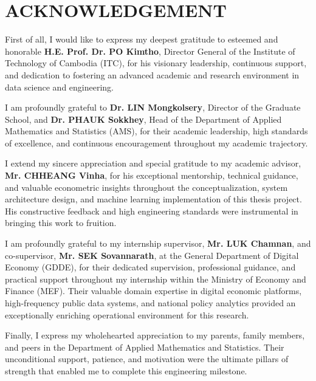 \chapter*{\centering ACKNOWLEDGEMENT}

\hs First of all, I would like to express my deepest gratitude to esteemed and honorable \textbf{H.E. Prof. Dr. PO Kimtho}, Director General of the Institute of Technology of Cambodia (ITC), for his visionary leadership, continuous support, and dedication to fostering an advanced academic and research environment in data science and engineering.

\hs I am profoundly grateful to \textbf{Dr. LIN Mongkolsery}, Director of the Graduate School, and \textbf{Dr. PHAUK Sokkhey}, Head of the Department of Applied Mathematics and Statistics (AMS), for their academic leadership, high standards of excellence, and continuous encouragement throughout my academic trajectory.

\hs I extend my sincere appreciation and special gratitude to my academic advisor, \textbf{Mr. CHHEANG Vinha}, for his exceptional mentorship, technical guidance, and valuable econometric insights throughout the conceptualization, system architecture design, and machine learning implementation of this thesis project. His constructive feedback and high engineering standards were instrumental in bringing this work to fruition.

\hs I am profoundly grateful to my internship supervisor, \textbf{Mr. LUK Chamnan}, and co-supervisor, \textbf{Mr. SEK Sovannarath}, at the General Department of Digital Economy (GDDE), for their dedicated supervision, professional guidance, and practical support throughout my internship within the Ministry of Economy and Finance (MEF). Their valuable domain expertise in digital economic platforms, high-frequency public data systems, and national policy analytics provided an exceptionally enriching operational environment for this research.


\hs Finally, I express my wholehearted appreciation to my parents, family members, and peers in the Department of Applied Mathematics and Statistics. Their unconditional support, patience, and motivation were the ultimate pillars of strength that enabled me to complete this engineering milestone.